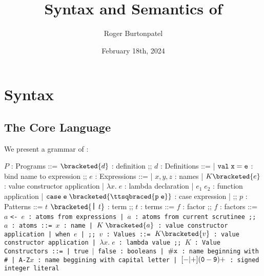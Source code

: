 \documentclass[]{article}
\title{Syntax and Semantics of \PPlus}
\author{Roger Burtonpatel}
\date{February 18th, 2024}
\begin{document}
\maketitle

\section{Syntax}

\subsection{The Core Language}

We present a grammar of \PPlus: 

\bigskip

\begin{center}
    \begin{bnf}
    $P$ : \textsf{Programs} ::=
    $\bracketed{d}$ : definition
    ;;
    $d$ : \textsf{Definitions} ::=
    | $\tt{val} \; x \; \tt{=} \; e$ : bind name to expression
    ;;
    $e$ : Expressions ::= 
    | $x, y, z$ : names
    | $K\bracketed{e}$ : value constructor application 
    | $\lambda x. \; e$ : lambda declaration  
    | $e_{1} \; e_{2}$ : function application 
    | $\tt{case} \; e \; \bracketed{\ttsqbraced{p \; e}}$ : case expression 
    | 
    ;;
    $p$ : \textsf{Patterns} ::= $t$ $\bracketed{\text{\large\texttt{\char`\|}}\mskip6mu t}$ : term
    ;;
    $t$ : terms ::= $f$  : factor
    ;;
    $f$ : factors ::= $a$ \tt{<-} $e$ : atoms from expressions 
        | $a$ : atoms from current scrutinee
    ;;
    $a$ : atoms ::= $x$ : name 
    | $K \; \bracketed{a}$ : value constructor application 
    | \tt{when} $e$
    | 
    ;;
    $v$ : Values ::= $K\bracketed{v}$ : value constructor application 
    | $\lambda x. \; e$ : lambda value 
    ;;
    $K$ : \textsf{Value Constructors} ::=
    | \tt{true} $\vert$ \tt{false} : booleans
    | $\tt{\#}x$ : name beginning with \tt{\#}
    | \tt{A-Z}$x$ : name beggining with capital letter
    | $[\tt{-}\vert\tt{+}](\tt{0}-\tt{9})+$ : signed integer literal 
    \end{bnf}
\end{center}
\end{document}
